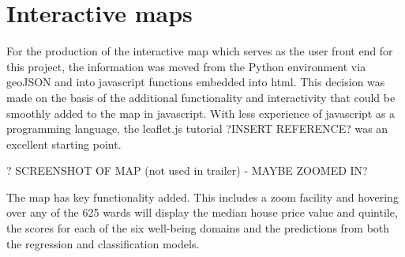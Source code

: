 \section{Interactive maps}

For the production of the interactive map which serves as the user front end for this project, the information was moved from the Python environment via geoJSON and into javascript functions embedded into html. This decision was made on the basis of the additional functionality and interactivity that could be smoothly added to the map in javascript. With less experience of javascript as a programming language, the leaflet.js tutorial ?INSERT REFERENCE? was an excellent starting point.

? SCREENSHOT OF MAP (not used in trailer) - MAYBE ZOOMED IN?

The map has key functionality added. This includes a zoom facility and hovering over any of the 625 wards will display the median house price value and quintile, the scores for each of the six well-being domains and the predictions from both the regression and classification models.








